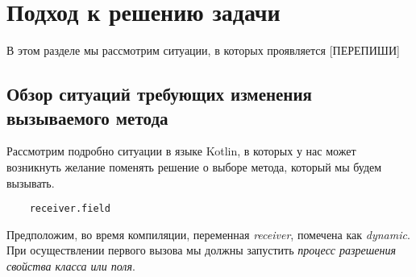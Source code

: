 \section{Подход к решению задачи}

В этом разделе мы рассмотрим ситуации, в которых проявляется [ПЕРЕПИШИ]

\subsection{Обзор ситуаций требующих изменения вызываемого метода}
\label{sec:methodChangeOverview}

Рассмотрим подробно ситуации в языке Kotlin, в которых у нас может возникнуть желание поменять решение о выборе метода, который мы будем вызывать.

\begin{verbatim}
    receiver.field
\end{verbatim}

Предположим, во время компиляции, переменная \textit{receiver}, помечена как \textit{dynamic}. При осуществлении первого
вызова мы должны запустить \textit{процесс разрешения свойства класса или поля}.



